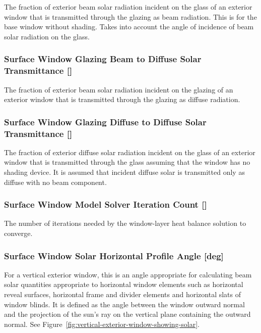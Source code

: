 The fraction of exterior beam solar radiation incident on the glass of an exterior window that is transmitted through the glazing as beam radiation. This is for the base window without shading. Takes into account the angle of incidence of beam solar radiation on the glass.

\subsubsection{Surface Window Glazing Beam to Diffuse Solar Transmittance {[]}}\label{surface-window-glazing-beam-to-diffuse-solar-transmittance}

The fraction of exterior beam solar radiation incident on the glazing of an exterior window that is transmitted through the glazing as diffuse radiation.

\subsubsection{Surface Window Glazing Diffuse to Diffuse Solar Transmittance {[]}}\label{surface-window-glazing-diffuse-to-diffuse-solar-transmittance}

The fraction of exterior diffuse solar radiation incident on the glass of an exterior window that is transmitted through the glass assuming that the window has no shading device. It is assumed that incident diffuse solar is transmitted only as diffuse with no beam component.

\subsubsection{Surface Window Model Solver Iteration Count {[]}}\label{surface-window-model-solver-iteration-count}

The number of iterations needed by the window-layer heat balance solution to converge.

\subsubsection{Surface Window Solar Horizontal Profile Angle {[}deg{]}}\label{surface-window-solar-horizontal-profile-angle-deg}

For a vertical exterior window, this is an angle appropriate for calculating beam solar quantities appropriate to horizontal window elements such as horizontal reveal surfaces, horizontal frame and divider elements and horizontal slats of window blinds. It is defined as the angle between the window outward normal and the projection of the sun's ray on the vertical plane containing the outward normal. See Figure~\ref{fig:vertical-exterior-window-showing-solar}.


